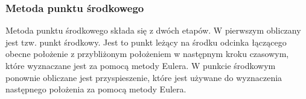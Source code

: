 
\subsubsection {Metoda punktu środkowego}

Metoda punktu środkowego składa się z dwóch etapów. W pierwszym obliczany jest tzw. punkt środkowy. Jest to punkt leżący na środku odcinka łączącego obecne położenie z przybliżonym położeniem w następnym kroku czasowym, które wyznaczane jest za pomocą metody Eulera. W punkcie środkowym ponownie obliczane jest przyspieszenie, które jest używane do wyznaczenia następnego położenia za pomocą metody Eulera.

\begin{center}

\end{center}


